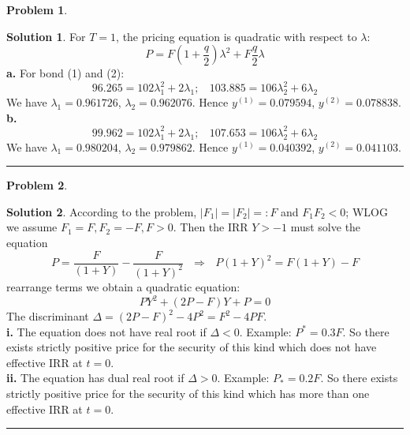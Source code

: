 \documentclass[a4paper, 10pt]{article}
\theoremstyle{definition}
\newtheorem{problem}{Problem}
\theoremstyle{hSol}
\newtheorem*{solution}{Solution}
\begin{document}
\begin{problem} 
\end{problem}
\begin{solution} For $T=1$, the pricing equation is quadratic with respect to $\lambda$:
$$
P = F\left(1+\frac{q}{2}\right)\lambda^2 + F\frac{q}{2} \lambda
$$
\textbf{a.} For bond (1) and (2):
$$
96.265 = 102\lambda_1^2 + 2 \lambda_1;~~~~103.885= 106\lambda_2^2 + 6 \lambda_2
$$
We have $\lambda_1=0.961726$, $\lambda_2 = 0.962076$. Hence $y^{(1)}=0.079594$, $y^{(2)}=0.078838$. \\
\textbf{b.}
$$
99.962 = 102\lambda_1^2 + 2 \lambda_1;~~~~107.653= 106\lambda_2^2 + 6 \lambda_2
$$
We have $\lambda_1=0.980204$, $\lambda_2 = 0.979862$. Hence $y^{(1)}=0.040392$, $y^{(2)}=0.041103$. \\
\end{solution}
\noindent\rule{16cm}{0.4pt}

\begin{problem} 
\end{problem}
\begin{solution} According to the problem, $|F_1| = |F_2| =: F$ and $F_1F_2 < 0$; WLOG we assume $F_1=F, F_2=-F, F>0$. Then the IRR $Y>-1$ must solve the equation
$$
P = \frac{F}{(1+Y)} - \frac{F}{(1+Y)^2}~~~\Rightarrow~~~P(1+Y)^2 = F(1+Y)-F
$$
rearrange terms we obtain a quadratic equation:
$$
PY^2 + (2P-F)Y + P = 0
$$
The discriminant $\Delta = (2P-F)^2 - 4P^2 = F^2-4PF$. \\
\textbf{i.} The equation does not have real root if $\Delta<0$. Example: $P^*=0.3F$. So there exists strictly positive price for the security of this kind which does not have effective IRR at $t=0$. \\
\textbf{ii.} The equation has dual real root if $\Delta>0$. Example: $P_*=0.2F$. So there exists strictly positive price for the security of this kind which has more than one effective IRR at $t=0$. \\
\end{solution}
\noindent\rule{16cm}{0.4pt}
\end{document}
